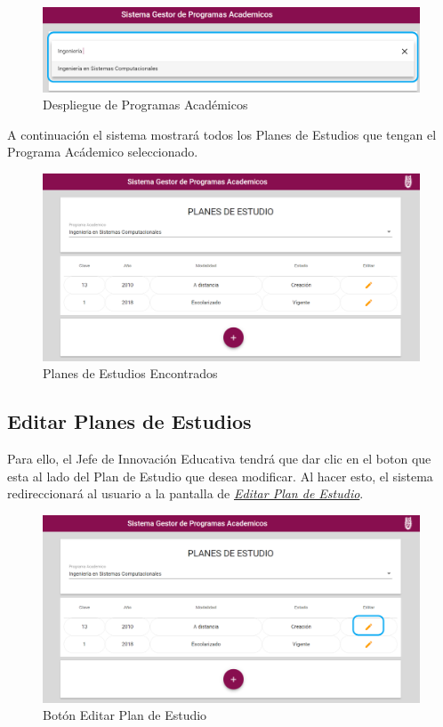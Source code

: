\begin{figure}[!hbtp]
	\centering
	\hypertarget{academico2}{\includegraphics[width=0.7\linewidth]{images/SP4-GPE/programaD}}
	\caption{Despliegue de Programas Académicos}
	\label{academico2}
\end{figure}

A continuación el sistema mostrará todos los Planes de Estudios que tengan el Programa Acádemico seleccionado.
\begin{figure}[!hbtp]
	\centering
	\hypertarget{planes}{\includegraphics[width=0.7\linewidth]{images/SP4-GPE/consultar}}
	\caption{Planes de Estudios Encontrados}
	\label{planes}
\end{figure}
\newpage
\subsection{Editar Planes de Estudios}

Para ello, el Jefe de Innovación Educativa tendrá que dar clic en el boton  que esta al lado del Plan de Estudio que desea modificar. Al hacer esto, el sistema redireccionará al usuario a la pantalla de \hyperlink{editarPE}{\textit{Editar Plan de Estudio}}.

\begin{figure}[!hbtp]
	\centering
	\hypertarget{editar}{\includegraphics[width=0.7\linewidth]{images/SP4-GPE/editarC}}
	\caption{Botón Editar Plan de Estudio}
	\label{editar}
\end{figure}

